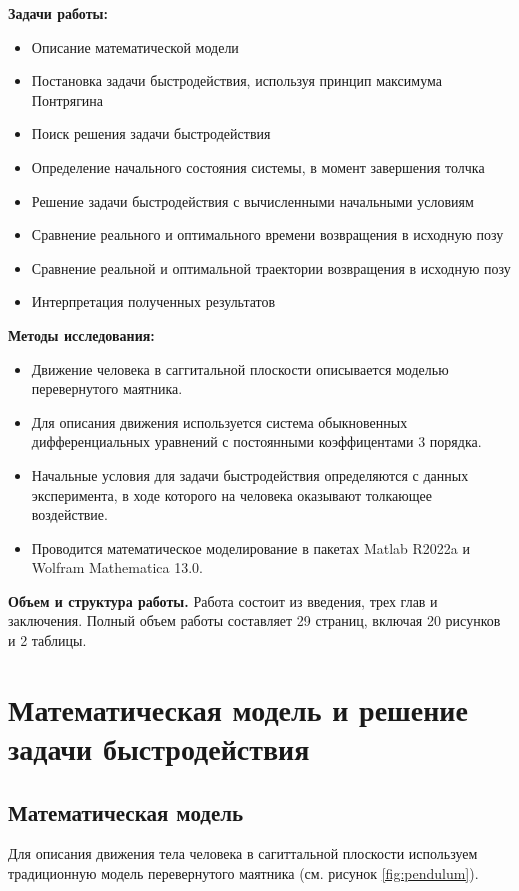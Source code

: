 \documentclass[a4paper,12pt, openany]{book}
\theoremstyle{plain} %
\theoremstyle{definition} %
\theoremstyle{remark} %
\numberwithin{equation}{chapter}
\begin{document}
{\textbf{Задачи работы: }
\begin{itemize}
    \item Описание математической модели
    \item Постановка задачи быстродействия, используя принцип максимума Понтрягина
    \item Поиск решения задачи быстродействия
    \item Определение начального состояния системы, в момент завершения толчка
    \item Решение задачи быстродействия с вычисленными начальными условиям
    \item Сравнение реального и оптимального времени возвращения в исходную позу
    \item Сравнение реальной и оптимальной траектории возвращения в исходную позу
    \item Интерпретация полученных результатов
\end{itemize}

\textbf{Методы исследования:}
\begin{itemize}
    \item Движение человека в саггитальной плоскости описывается моделью перевернутого маятника.
    \item Для описания движения используется система обыкновенных дифференциальных уравнений с постоянными коэффицентами 3 порядка.
    \item Начальные условия для задачи быстродействия определяются с данных эксперимента, в ходе которого на человека оказывают толкающее воздействие.
    \item Проводится математическое моделирование в пакетах Matlab R2022a и Wolfram Mathematica 13.0.
\end{itemize}




\textbf{Объем и структура работы.} Работа состоит из введения, трех глав и заключения. Полный объем работы составляет
29 страниц, включая 20 рисунков и 2 таблицы.

\newpage

\chapter{Математическая модель и решение задачи быстродействия}
\section{Математическая модель}
Для описания движения тела человека в сагиттальной плоскости используем традиционную модель перевернутого маятника (см. рисунок \ref{fig:pendulum}).

}
\end{document}

